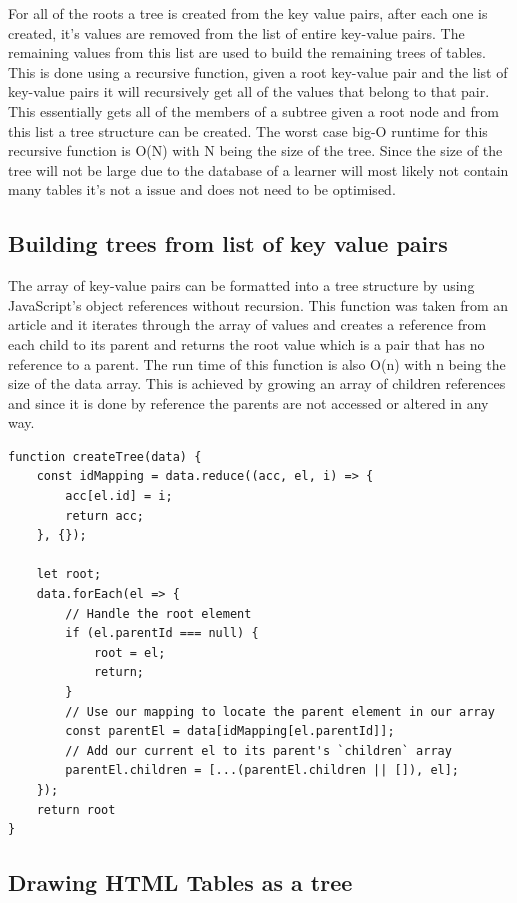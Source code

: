 For all of the roots a tree is created from the key value pairs, after each one is created, it's values are removed from the list of entire key-value pairs. The remaining values from this list are used to build the remaining trees of tables. This is done using a recursive function, given a root key-value pair and the list of key-value pairs it will recursively get all of the values that belong to that pair. This essentially gets all of the members of a subtree given a root node and from this list a tree structure can be created. The worst case big-O runtime for this recursive function is O(N) with N being the size of the tree. Since the size of the tree will not be large due to the database of a learner will most likely not contain many tables it's not a issue and does not need to be optimised. 

\subsection{Building trees from list of key value pairs}

The array of key-value pairs can be formatted into a tree structure by using JavaScript's object references without recursion.  This function was taken from an article \cite{reference} and it iterates through the array of values and creates a reference from each child to its parent and returns the root value which is a pair that has no reference to a parent. The run time of this function is also O(n) with n being the size of the data array. This is achieved by growing an array of children references and since it is done by reference the parents are not accessed or altered in any way.

\begin{lstlisting}[style=JavaScript, caption={JavaScript function to build a tree from a list of key value pairs.}]
function createTree(data) {
	const idMapping = data.reduce((acc, el, i) => {
		acc[el.id] = i;
		return acc;
	}, {});
	
	let root;
	data.forEach(el => {
		// Handle the root element
		if (el.parentId === null) {
			root = el;
			return;
		}
		// Use our mapping to locate the parent element in our array
		const parentEl = data[idMapping[el.parentId]];
		// Add our current el to its parent's `children` array
		parentEl.children = [...(parentEl.children || []), el];
	});
	return root
}
\end{lstlisting}

\subsection{Drawing HTML Tables as a tree}

